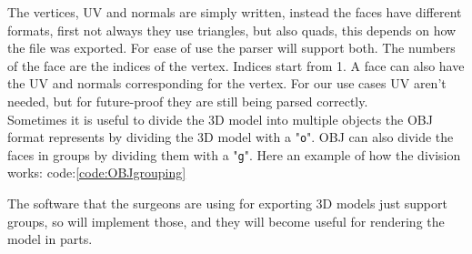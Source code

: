 
\noindent
The vertices, UV and normals are simply written, instead the faces have different formats, first not always they use triangles, but also quads, this depends on how the file was exported.
For ease of use the parser will support both. The numbers of the face are the indices of the vertex. Indices start from 1.
A face can also have the UV and normals corresponding for the vertex. For our use cases UV aren't needed, but for future-proof they are still being parsed correctly.\\
Sometimes it is useful to divide the 3D model into multiple objects the OBJ format represents by dividing the 3D model with a "\verb|o|".
OBJ can also divide the faces in groups by dividing them with a "\verb|g|".
Here an example of how the division works: code:\ref{code:OBJgrouping}


\noindent
The software that the surgeons are using for exporting 3D models just support groups, so will implement those, and they will become useful for rendering the model in parts.

